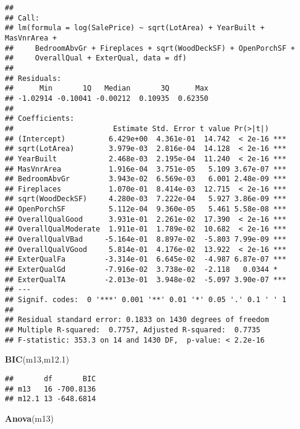 \documentclass[
]{article}
\newenvironment{Shaded}{\begin{snugshade}}{\end{snugshade}}
\newcommand{\FloatTok}[1]{\textcolor[rgb]{0.00,0.00,0.81}{#1}}
\newcommand{\FunctionTok}[1]{\textcolor[rgb]{0.13,0.29,0.53}{\textbf{#1}}}
\newcommand{\NormalTok}[1]{#1}
\begin{document}
\begin{verbatim}
## 
## Call:
## lm(formula = log(SalePrice) ~ sqrt(LotArea) + YearBuilt + MasVnrArea + 
##     BedroomAbvGr + Fireplaces + sqrt(WoodDeckSF) + OpenPorchSF + 
##     OverallQual + ExterQual, data = df)
## 
## Residuals:
##      Min       1Q   Median       3Q      Max 
## -1.02914 -0.10041 -0.00212  0.10935  0.62350 
## 
## Coefficients:
##                       Estimate Std. Error t value Pr(>|t|)    
## (Intercept)          6.429e+00  4.361e-01  14.742  < 2e-16 ***
## sqrt(LotArea)        3.979e-03  2.816e-04  14.128  < 2e-16 ***
## YearBuilt            2.468e-03  2.195e-04  11.240  < 2e-16 ***
## MasVnrArea           1.916e-04  3.751e-05   5.109 3.67e-07 ***
## BedroomAbvGr         3.943e-02  6.569e-03   6.001 2.48e-09 ***
## Fireplaces           1.070e-01  8.414e-03  12.715  < 2e-16 ***
## sqrt(WoodDeckSF)     4.280e-03  7.222e-04   5.927 3.86e-09 ***
## OpenPorchSF          5.112e-04  9.360e-05   5.461 5.58e-08 ***
## OverallQualGood      3.931e-01  2.261e-02  17.390  < 2e-16 ***
## OverallQualModerate  1.911e-01  1.789e-02  10.682  < 2e-16 ***
## OverallQualVBad     -5.164e-01  8.897e-02  -5.803 7.99e-09 ***
## OverallQualVGood     5.814e-01  4.176e-02  13.922  < 2e-16 ***
## ExterQualFa         -3.314e-01  6.645e-02  -4.987 6.87e-07 ***
## ExterQualGd         -7.916e-02  3.738e-02  -2.118   0.0344 *  
## ExterQualTA         -2.013e-01  3.948e-02  -5.097 3.90e-07 ***
## ---
## Signif. codes:  0 '***' 0.001 '**' 0.01 '*' 0.05 '.' 0.1 ' ' 1
## 
## Residual standard error: 0.1833 on 1430 degrees of freedom
## Multiple R-squared:  0.7757, Adjusted R-squared:  0.7735 
## F-statistic: 353.3 on 14 and 1430 DF,  p-value: < 2.2e-16
\end{verbatim}

\begin{Shaded}
\begin{Highlighting}[]
\FunctionTok{BIC}\NormalTok{(m13,m12}\FloatTok{.1}\NormalTok{)}
\end{Highlighting}
\end{Shaded}

\begin{verbatim}
##       df       BIC
## m13   16 -700.8136
## m12.1 13 -648.6814
\end{verbatim}

\begin{Shaded}
\begin{Highlighting}[]
\FunctionTok{Anova}\NormalTok{(m13)}
\end{Highlighting}
\end{Shaded}
\end{document}
